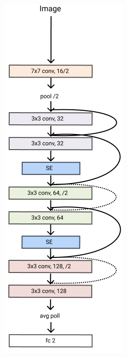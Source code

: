 \documentclass[../document.tex]{subfiles}
\begin{document}
\begin{figure}[htbp]
\begin{subfigure}[b]{0.25\textwidth}
    \end{subfigure}
    \begin{subfigure}[b]{0.25\textwidth}
        \includegraphics[width=\textwidth]{../img/3/models/transparent-microresnet-se.png}
    \end{subfigure} 


\end{figure}
\end{document}
